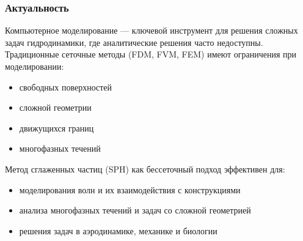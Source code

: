 \begin{frame}
    \setcounter{framenumber}{1}
    \maketitle
\end{frame}

\begin{frame}
    \frametitle{Актуальность}

    \begin{block}{}
        \footnotesize
        Компьютерное моделирование --- ключевой инструмент для решения сложных задач гидродинамики, 
        где аналитические решения часто недоступны. 
        Традиционные сеточные методы (FDM, FVM, FEM) имеют ограничения при моделировании:
        \begin{itemize}
            \item свободных поверхностей
            \item сложной геометрии
            \item движущихся границ
            \item многофазных течений
        \end{itemize}
    \end{block}

    \begin{block}{}
        \footnotesize
        Метод сглаженных частиц (SPH) как бессеточный подход эффективен для:
        \begin{itemize}
            \item моделирования волн и их взаимодействия с конструкциями
            \item анализа многофазных течений и задач со сложной геометрией
            \item решения задач в аэродинамике, механике и биологии
        \end{itemize}
    \end{block}
\end{frame}

